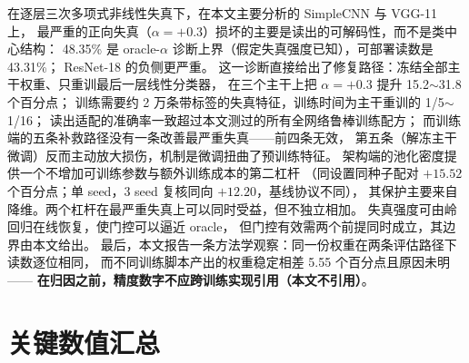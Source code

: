 \documentclass[11pt,a4paper]{ctexart}
\begin{document}
在逐层三次多项式非线性失真下，在本文主要分析的 SimpleCNN 与 VGG-11 上，
最严重的正向失真（$\alpha=+0.3$）损坏的主要是读出的可解码性，而不是类中心结构：
48.35\% 是 oracle-$\alpha$ 诊断上界（假定失真强度已知），可部署读数是 43.31\%；
ResNet-18 的负侧更严重。
这一诊断直接给出了修复路径：冻结全部主干权重、只重训最后一层线性分类器，
在三个主干上把 $\alpha=+0.3$ 提升 15.2$\sim$31.8 个百分点；
训练需要约 2 万条带标签的失真特征，训练时间为主干重训的 1/5$\sim$1/16；
读出适配的准确率一致超过本文测过的所有全网络鲁棒训练配方；
而训练端的五条补救路径没有一条改善最严重失真——前四条无效，
第五条（解冻主干微调）反而主动放大损伤，机制是微调扭曲了预训练特征。
架构端的池化密度提供一个不增加可训练参数与额外训练成本的第二杠杆
（同设置同种子配对 $+15.52$ 个百分点；单 seed，3 seed 复核同向 $+12.20$，基线协议不同），
其保护主要来自降维。两个杠杆在最严重失真上可以同时受益，但不独立相加。
失真强度可由岭回归在线恢复，使门控可以逼近 oracle，
但门控有效需两个前提同时成立，其边界由本文给出。
最后，本文报告一条方法学观察：同一份权重在两条评估路径下读数逐位相同，
而不同训练脚本产出的权重稳定相差 5.55 个百分点且原因未明——
\textbf{在归因之前，精度数字不应跨训练实现引用（本文不引用）}。

\appendix
\section{关键数值汇总}
\end{document}
